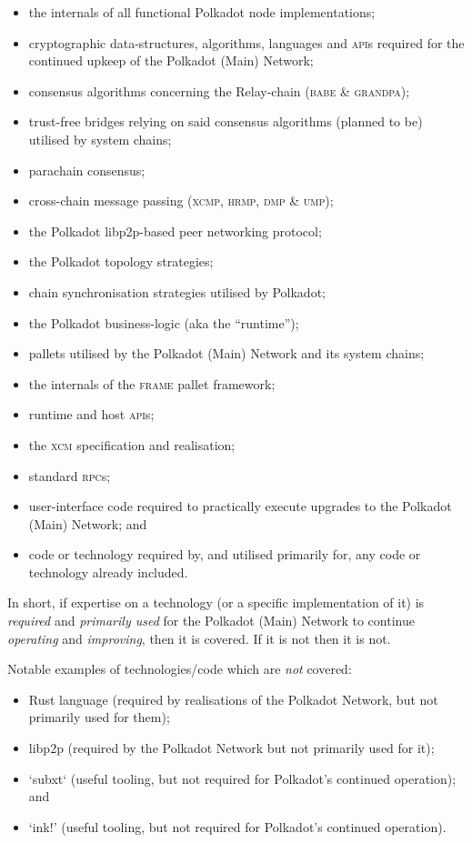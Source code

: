 \documentclass[9pt,oneside]{amsart}
\begin{document}
\begin{itemize}
 \item the internals of all functional Polkadot node implementations;
 \item cryptographic data-structures, algorithms, languages and \textsc{api}s required for the continued upkeep of the Polkadot (Main) Network;
 \item consensus algorithms concerning the Relay-chain (\textsc{babe} \& \textsc{grandpa});
 \item trust-free bridges relying on said consensus algorithms (planned to be) utilised by system chains;
 \item parachain consensus;
 \item cross-chain message passing (\textsc{xcmp}, \textsc{hrmp}, \textsc{dmp} \& \textsc{ump});
 \item the Polkadot libp2p-based peer networking protocol;
 \item the Polkadot topology strategies;
 \item chain synchronisation strategies utilised by Polkadot;
 \item the Polkadot business-logic (aka the ``runtime'');
 \item pallets utilised by the Polkadot (Main) Network and its system chains;
 \item the internals of the \textsc{frame} pallet framework;
 \item runtime and host \textsc{api}s;
 \item the \textsc{xcm} specification and realisation;
 \item standard \textsc{rpc}s;
 \item user-interface code required to practically execute upgrades to the Polkadot (Main) Network; and
 \item code or technology required by, and utilised primarily for, any code or technology already included.
\end{itemize}

In short, if expertise on a technology (or a specific implementation of it) is \emph{required} and \emph{primarily used} for the Polkadot (Main) Network to continue \emph{operating} and \emph{improving}, then it is covered. If it is not then it is not.

Notable examples of technologies/code which are \emph{not} covered:

\begin{itemize}
  \item Rust language (required by realisations of the Polkadot Network, but not primarily used for them);
  \item libp2p (required by the Polkadot Network but not primarily used for it);
  \item `subxt` (useful tooling, but not required for Polkadot's continued operation); and
  \item `ink!' (useful tooling, but not required for Polkadot's continued operation).
\end{itemize}
\end{document}
